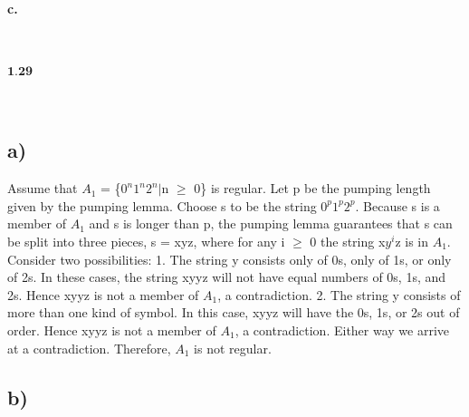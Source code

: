 \documentclass{scrartcl}
\begin{document}
\noindent\textbf{c.}
\\
\\
\\
	

\noindent$\textbf{1.29}$
\\
\\
\\


\subsection*{a)}

 Assume that $A_1$ = \{$0^n$$1^n$$2^n$$\mid$n $\geq$ 0\} is regular. Let p be the pumping length
given by the pumping lemma. Choose s to be the string $0^p$$1^p$$2^p$. Because s is a
member of $A_1$ and s is longer than p, the pumping lemma guarantees that s can
be split into three pieces, s = xyz, where for any i $\geq$ 0 the string x$y^i$z is in $A_1$.
Consider two possibilities:
1. The string y consists only of 0s, only of 1s, or only of 2s. In these cases, the
string xyyz will not have equal numbers of 0s, 1s, and 2s. Hence xyyz is not
a member of $A_1$, a contradiction.
2. The string y consists of more than one kind of symbol. In this case, xyyz
will have the 0s, 1s, or 2s out of order. Hence xyyz is not a member of $A_1$,
a contradiction.
Either way we arrive at a contradiction. Therefore, $A_1$ is not regular.

\subsection*{b)}
\end{document}

